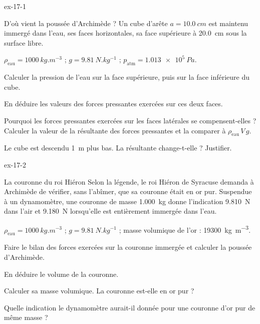 \begin{blocLivre}{ex-17-1}
\begin{exercice}[1]{D'où vient la poussée d'Archimède ?}
Un cube d'arête $a=\qty{10,0}{cm}$ est maintenu immergé dans l'eau, ses faces horizontales, sa face supérieure à
\qty{20,0}{cm} sous la surface libre.
\begin{donnees}
$\rho_\mathrm{eau}=\qty{1000}{kg.m^{-3}}$ ; $g=\qty{9,81}{N.kg^{-1}}$ ; $p_\mathrm{atm}=\qty{1,013e5}{Pa}$.
\end{donnees}
\begin{questions}
\item Calculer la pression de l'eau sur la face supérieure, puis sur la face inférieure du cube.
\item En déduire les valeurs des forces pressantes exercées sur ces deux faces.
\item Pourquoi les forces pressantes exercées sur les faces latérales se compensent-elles ? Calculer la valeur de la
résultante des forces pressantes et la comparer à $\rho_\mathrm{eau}\,V\,g$.
\item Le cube est descendu \qty{1}{m} plus bas. La résultante change-t-elle ? Justifier.
\end{questions}
\end{exercice}
\end{blocLivre}
\begin{blocLivre}{ex-17-2}
\begin{exercice}[1]{La couronne du roi Hiéron}
Selon la légende, le roi Hiéron de Syracuse demanda à Archimède de vérifier, sans l'abîmer, que sa couronne était en or
pur. Suspendue à un dynamomètre, une couronne de masse \qty{1,000}{kg} donne l'indication \qty{9,810}{N} dans l'air et
\qty{9,180}{N} lorsqu'elle est entièrement immergée dans l'eau.
\begin{donnees}
$\rho_\mathrm{eau}=\qty{1000}{kg.m^{-3}}$ ; $g=\qty{9,81}{N.kg^{-1}}$ ; masse volumique de l'or : \qty{19300}{kg.m^{-3}}.
\end{donnees}
\begin{questions}
\item Faire le bilan des forces exercées sur la couronne immergée et calculer la poussée d'Archimède.
\item En déduire le volume de la couronne.
\item Calculer sa masse volumique. La couronne est-elle en or pur ?
\item Quelle indication le dynamomètre aurait-il donnée pour une couronne d'or pur de même masse ?
\end{questions}
\end{exercice}
\end{blocLivre}
